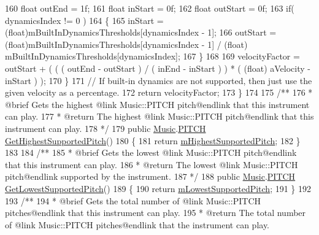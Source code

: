 \begin{DoxyCodeInclude}
160             \textcolor{keywordtype}{float} outEnd = 1f;
161             \textcolor{keywordtype}{float} inStart = 0f;
162             \textcolor{keywordtype}{float} outStart = 0f;
163             \textcolor{keywordflow}{if}( dynamicsIndex != 0 )
164             \{
165                 inStart = (float)mBuiltInDynamicsThresholds[dynamicsIndex - 1];
166                 outStart = (float)mBuiltInDynamicsThresholds[dynamicsIndex - 1] / (\textcolor{keywordtype}{float})
      mBuiltInDynamicsThresholds[dynamicsIndex];
167             \}
168 
169             velocityFactor = outStart + ( ( ( outEnd - outStart ) / ( inEnd - inStart ) ) * ( (\textcolor{keywordtype}{float})
      aVelocity - inStart ) );
170         \}
171         \textcolor{comment}{// If built-in dynamics are not supported, then just use the given velocity as a percentage. }
172         \textcolor{keywordflow}{return} velocityFactor;
173     \}
174 \textcolor{comment}{}
175 \textcolor{comment}{    /**}
176 \textcolor{comment}{     * @brief Gets the highest @link Music::PITCH pitch@endlink that this instrument can play.}
177 \textcolor{comment}{     * @return The highest @link Music::PITCH pitch@endlink that this instrument can play.}
178 \textcolor{comment}{     */}
179     \textcolor{keyword}{public} \hyperlink{class_music}{Music}.\hyperlink{group___music_enums_ga508f69b199ea518f935486c990edac1d}{PITCH} \hyperlink{group___v_i_base_pub_func_ga859f3e73b1d28051cecf0ecd1c8b10ee}{GetHighestSupportedPitch}()
180     \{
181         \textcolor{keywordflow}{return} \hyperlink{group___v_i_base_pro_var_ga61fb2c33b53a0f663047779d7ceb18f3}{mHighestSupportedPitch};
182     \}
183 \textcolor{comment}{}
184 \textcolor{comment}{    /**}
185 \textcolor{comment}{     * @brief Gets the lowest @link Music::PITCH pitch@endlink that this instrument can play.}
186 \textcolor{comment}{     * @return The lowest @link Music::PITCH pitch@endlink supported by the instrument.}
187 \textcolor{comment}{     */}
188     \textcolor{keyword}{public} \hyperlink{class_music}{Music}.\hyperlink{group___music_enums_ga508f69b199ea518f935486c990edac1d}{PITCH} \hyperlink{group___v_i_base_pub_func_gac42b3915bbfec60b83650abd701d0690}{GetLowestSupportedPitch}()
189     \{
190         \textcolor{keywordflow}{return} \hyperlink{group___v_i_base_pro_var_ga3cae52b1bcc0178a8a6b03c7aaf7aac8}{mLowestSupportedPitch};
191     \}
192 \textcolor{comment}{}
193 \textcolor{comment}{    /**}
194 \textcolor{comment}{     * @brief Gets the total number of @link Music::PITCH pitches@endlink that this instrument can play.}
195 \textcolor{comment}{     * @return The total number of @link Music::PITCH pitches@endlink that the instrument can play.}

\end{DoxyCodeInclude}
